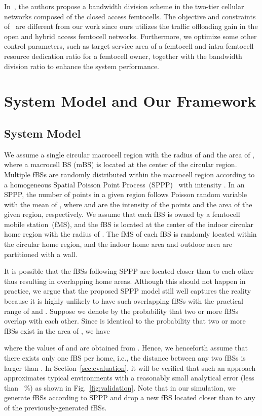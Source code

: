 \documentclass[journal]{IEEEtran}
\begin{document}
In~\cite{tcom09chandrasekhar},
the authors  propose a bandwidth division scheme in the two-tier cellular networks composed of the closed access femtocells. The objective and constraints of~\cite{tcom09chandrasekhar} are different from our work since ours
utilizes the traffic offloading gain in the open and hybrid access femtocell networks.
Furthermore, we optimize some other control parameters, such as target service area of a femtocell and intra-femtocell resource dedication ratio for a femtocell owner, together with the bandwidth division ratio to enhance the system performance.

\section{System Model and Our Framework}
\label{sec:system_model}
\subsection{System Model}
\label{subsec:femto_model}

We assume a single circular macrocell region with
the radius of  and the area of ,
where a macrocell BS (mBS) is located at the center of the circular region.
Multiple
fBSs are randomly distributed within the macrocell region according to
a homogeneous Spatial Poisson Point Process~(SPPP)~\cite{book93kingman} with intensity .
In an SPPP, the number of points in a given region follows Poisson random variable
with the mean of , where  and  are the intensity of the points
and the area of the given region, respectively.
We assume that each fBS is owned by a femtocell mobile station~(fMS),
and the fBS is located at the center of the indoor circular home region
with the radius of .
The fMS
of each fBS is randomly located within the
circular home region, and the indoor home area and outdoor area are partitioned with a wall.


It is possible that the fBSs following SPPP are located closer than  to each other thus resulting in overlapping home areas.
Although this should not happen in practice, we argue that the proposed SPPP model still well captures the reality because it is highly unlikely to have such overlapping fBSs with the practical range of  and .
Suppose we denote by  the probability that two or more fBSs overlap with each other. Since  is identical to the probability that two or more fBSs exist in the area of , we have

\noindent where the values of  and  are obtained from {\cite{census2010_kr,census2010_us}}.
Hence, we henceforth assume that there exists only one fBS per home, i.e., the distance between any two fBSs is larger than .
In Section~\ref{sec:evaluation}, it will be verified that such an approach approximates typical environments with a reasonably small analytical error (less than ~\%) as shown in Fig.~\ref{fig:validation}.
Note that in our simulation, we generate fBSs according to SPPP and drop a new fBS located closer than  to any of the previously-generated fBSs.
\end{document}
